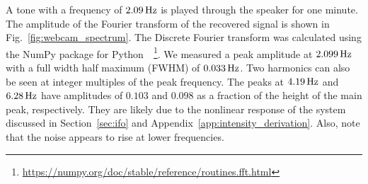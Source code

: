 \documentclass[paper-main.tex]{subfiles}
\begin{document}
A tone with a frequency of $2.09\,{\rm Hz}$ is played through the speaker for one minute. 
The amplitude of the Fourier transform of the recovered signal is shown in Fig.~\ref{fig:webcam_spectrum}. The Discrete Fourier transform was calculated using the NumPy package for Python~\cite{numpy}~\footnote{\url{https://numpy.org/doc/stable/reference/routines.fft.html}}.
We measured a peak amplitude at $2.099\,{\rm Hz}$ with a full width half maximum (FWHM) of $0.033\,{\rm Hz}$.
Two harmonics can also be seen at integer multiples of the peak frequency. 
The peaks at $4.19\,{\rm Hz}$ and $6.28\,{\rm Hz}$ have amplitudes of $0.103$ and $0.098$ as a fraction of the height of the main peak, respectively. They are likely due to the nonlinear response of the system discussed in Section~\ref{sec:ifo} and Appendix~\ref{app:intensity_derivation}. Also, note that the noise appears to rise at lower frequencies.
\end{document}
